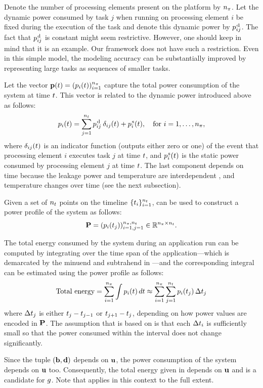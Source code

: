 Denote the number of processing elements present on the platform by ${n_\pi}$. Let
the dynamic power consumed by task $j$ when running on processing element $i$ be
fixed during the execution of the task and denote this dynamic power by
$p^{\text{\kern0.1emd}}_{ij}$. The fact that $p^{\text{\kern0.1emd}}_{ij}$ is constant might seem
restrictive. However, one should keep in mind that it is an example. Our
framework does not have such a restriction. Even in this simple model, the
modeling accuracy can be substantially improved by representing large tasks as
sequences of smaller tasks.

Let the vector $\mathbf{p}(t) = (p_i(t))_{i = 1}^{{n_\pi}}$ capture the total power
consumption of the system at time $t$. This vector is related to the dynamic
power introduced above as follows:
\begin{equation} \elab{power}
  \p_i(\t) = \sum_{j = 1}^\nt \p^\dynamic_{ij} \: \delta_{ij} (\t) + \p^\static_i(\t), \hspace{1em} \text{for $i = 1, \dots, \np$},
\end{equation}
where $\delta_{ij}(t)$ is an indicator function (outputs either zero or one) of
the event that processing element $i$ executes task $j$ at time $t$, and
$p^{\text{\kern0.1ems}}_i(t)$ is the static power consumed by processing element $j$ at
time $t$. The last component depends on time because the leakage power and
temperature are interdependent \cite{liu2007}, and temperature changes over time
(see the next subsection).

Given a set of ${n_t}$ points on the timeline $\{ t_i \}_{i = 1}^{n_t}$,
 can be used to construct a power profile of the system as follows:
\[
  \mathbf{P} = (p_i(t_j))_{i = 1, j = 1}^{{n_\pi}, {n_t}} \in \mathbb{R}^{{n_\pi} \times {n_t}}.
\]

The total energy consumed by the system during an application run can be
computed by integrating  over the time span of the
application---which is demarcated by the minuend and subtrahend in
---and the corresponding integral can be estimated using
the power profile as follows:
\begin{equation} \elab{total-energy}
  \text{Total energy} = \sum_{i = 1}^\np \int \p_i(\t) \, \d\t \approx \sum_{i = 1}^\np \sum_{j = 1}^\ns \p_i(\t_j) \, \Delta\t_j
\end{equation}
where $\Delta t_j$ is either $t_j - t_{j - 1}$ or $t_{j + 1} - t_j$,
depending on how power values are encoded in $\mathbf{P}$. The assumption that
 is based on is that each $\Delta t_i$ is sufficiently small
so that the power consumed within the interval does not change significantly.

Since the tuple $(\mathbf{b}, \mathbf{d})$ depends on $\mathbf{u}$, the power consumption of the
system depends on $\mathbf{u}$ too. Consequently, the total energy given in
 depends on $\mathbf{u}$ and is a candidate for $g$. Note that
 applies in this context to the full extent.
